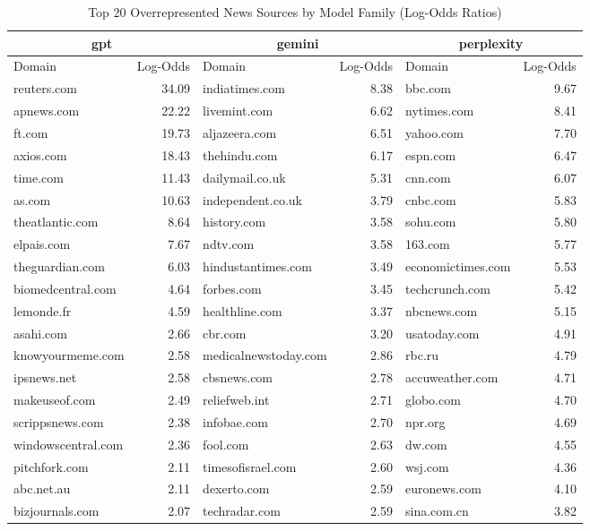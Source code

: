 \begin{table*}[htbp]
\centering
\caption{Top 20 Overrepresented News Sources by Model Family (Log-Odds Ratios)}
\label{tab:overrepresented_news_sources}
\begin{tabular}{lr|lr|lr}
\toprule
\multicolumn{2}{c|}{\textbf{gpt}} & \multicolumn{2}{c|}{\textbf{gemini}} & \multicolumn{2}{c}{\textbf{perplexity}} \\
\midrule
Domain & Log-Odds & Domain & Log-Odds & Domain & Log-Odds \\
\midrule
reuters.com & 34.09 & indiatimes.com & 8.38 & bbc.com & 9.67 \\
apnews.com & 22.22 & livemint.com & 6.62 & nytimes.com & 8.41 \\
ft.com & 19.73 & aljazeera.com & 6.51 & yahoo.com & 7.70 \\
axios.com & 18.43 & thehindu.com & 6.17 & espn.com & 6.47 \\
time.com & 11.43 & dailymail.co.uk & 5.31 & cnn.com & 6.07 \\
as.com & 10.63 & independent.co.uk & 3.79 & cnbc.com & 5.83 \\
theatlantic.com & 8.64 & history.com & 3.58 & sohu.com & 5.80 \\
elpais.com & 7.67 & ndtv.com & 3.58 & 163.com & 5.77 \\
theguardian.com & 6.03 & hindustantimes.com & 3.49 & economictimes.com & 5.53 \\
biomedcentral.com & 4.64 & forbes.com & 3.45 & techcrunch.com & 5.42 \\
lemonde.fr & 4.59 & healthline.com & 3.37 & nbcnews.com & 5.15 \\
asahi.com & 2.66 & cbr.com & 3.20 & usatoday.com & 4.91 \\
knowyourmeme.com & 2.58 & medicalnewstoday.com & 2.86 & rbc.ru & 4.79 \\
ipsnews.net & 2.58 & cbsnews.com & 2.78 & accuweather.com & 4.71 \\
makeuseof.com & 2.49 & reliefweb.int & 2.71 & globo.com & 4.70 \\
scrippsnews.com & 2.38 & infobae.com & 2.70 & npr.org & 4.69 \\
windowscentral.com & 2.36 & fool.com & 2.63 & dw.com & 4.55 \\
pitchfork.com & 2.11 & timesofisrael.com & 2.60 & wsj.com & 4.36 \\
abc.net.au & 2.11 & dexerto.com & 2.59 & euronews.com & 4.10 \\
bizjournals.com & 2.07 & techradar.com & 2.59 & sina.com.cn & 3.82 \\
\bottomrule
\end{tabular}
\end{table*}